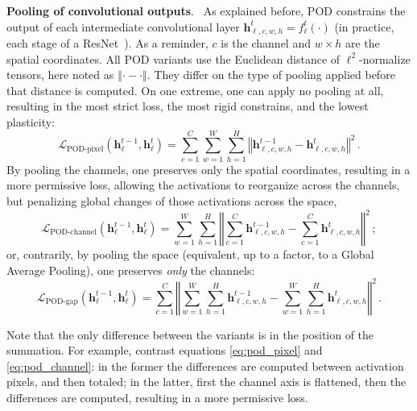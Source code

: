 \documentclass[runningheads]{llncs}
\newcommand{\mcL}{\mathcal{L}}
\newcommand{\vh}{\mathbf{h}}
\newcommand{\parag}[1]{\vspace{0.2cm}\noindent\textbf{#1}.\ }
\begin{document}
\parag{Pooling of convolutional outputs} As explained before, POD constrains the output of each intermediate convolutional layer $\vh^{t}_{\ell,c,w,h} = f^{t}_\ell(\cdot)$ (in practice, each stage of a ResNet~\cite{he2016resnet}). As a reminder, $c$ is the channel and $w\times h$ are the spatial coordinates. All POD variants use the Euclidean distance of $\ell^2$-normalize tensors, here noted as $\left\Vert\cdot-\cdot\right\Vert$. They differ on the type of pooling applied before that distance is computed.
On one extreme, one can apply no pooling at all, resulting in the most strict loss, the most rigid constrains, and the lowest plasticity:
\begin{equation}
    \mcL_{\text{POD-pixel}}(\vh^{t-1}_\ell, \vh^t_\ell) = \sum_{c=1}^C \sum_{w=1}^{W} \sum_{h=1}^{H} \left\Vert \vh^{t-1}_{\ell,c,w,h} - \vh^t_{\ell,c,w,h} \right\Vert^2\label{eq:pod_pixel}\,.
\end{equation}
By pooling the channels, one preserves only the spatial coordinates, resulting in a more permissive loss, allowing the activations to reorganize across the channels, but penalizing global changes of those activations across the space,
\begin{equation}
    \mcL_{\text{POD-channel}}(\vh^{t-1}_\ell, \vh^t_\ell)  = \sum_{w=1}^{W} \sum_{h=1}^{H} \left\Vert \sum_{c=1}^C \vh^{t-1}_{\ell,c,w,h} - \sum_{c=1}^C \vh^{t}_{\ell,c,w,h} \right\Vert^2\label{eq:pod_channel}\,;
\end{equation}
or, contrarily, by pooling the space (equivalent, up to a factor, to a Global Average Pooling), one preserves \textit{only} the channels:
\begin{equation}
    \mcL_{\text{POD-gap}}(\vh^{t-1}_\ell, \vh^t_\ell) = \sum_{c=1}^{C} \left\Vert \sum_{w=1}^{W} \sum_{h=1}^H \vh^{t-1}_{\ell,c,w,h} - \sum_{w=1}^{W} \sum_{h=1}^H \vh^{t}_{\ell,c,w,h} \right\Vert^2\label{eq:pod_gap}\,.
\end{equation}


Note that the only difference between the variants is in the position of the summation. For example, contrast equations \autoref{eq:pod_pixel} and \ref{eq:pod_channel}: in the former the differences are computed between activation pixels, and then totaled; in the latter, first the channel axis is flattened, then the differences are computed, resulting in a more permissive loss. 
\end{document}
